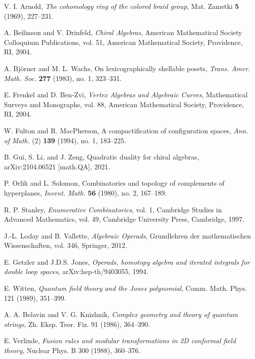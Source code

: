 \begin{thebibliography}{99}

V. I. Arnold, \emph{The cohomology ring of the colored braid group}, 
Mat. Zametki \textbf{5} (1969), 227--231.

 A. Beilinson and V. Drinfeld, \emph{Chiral Algebras}, American Mathematical Society Colloquium Publications, vol. 51, American Mathematical Society, Providence, RI, 2004.
 
 A. Björner and M. L. Wachs, On lexicographically shellable posets, \emph{Trans. Amer. Math. Soc.} \textbf{277} (1983), no. 1, 323--331.
 
 E. Frenkel and D. Ben-Zvi, \emph{Vertex Algebras and Algebraic Curves}, Mathematical Surveys and Monographs, vol. 88, American Mathematical Society, Providence, RI, 2004.
 
 W. Fulton and R. MacPherson, A compactification of configuration spaces, \emph{Ann. of Math.} (2) \textbf{139} (1994), no. 1, 183--225.
 
 B. Gui, S. Li, and J. Zeng, Quadratic duality for chiral algebras, arXiv:2104.06521 [math.QA], 2021.
 
 P. Orlik and L. Solomon, Combinatorics and topology of complements of hyperplanes, \emph{Invent. Math.} \textbf{56} (1980), no. 2, 167--189.
 
 R. P. Stanley, \emph{Enumerative Combinatorics}, vol. 1, Cambridge Studies in Advanced Mathematics, vol. 49, Cambridge University Press, Cambridge, 1997.

 J.-L. Loday and B. Vallette, \emph{Algebraic Operads}, Grundlehren der mathematischen Wissenschaften, vol. 346, Springer, 2012.

 E. Getzler and J.D.S. Jones, \emph{Operads, homotopy algebra and iterated integrals for double loop spaces}, arXiv:hep-th/9403055, 1994.

 E. Witten, \emph{Quantum field theory and the Jones polynomial}, 
  Comm. Math. Phys. 121 (1989), 351--399.

 A. A. Belavin and V. G. Knizhnik, \emph{Complex geometry and theory of quantum strings}, 
  Zh. Eksp. Teor. Fiz. 91 (1986), 364--390.
  
 E. Verlinde, \emph{Fusion rules and modular transformations in 2D conformal field theory}, 
  Nuclear Phys. B 300 (1988), 360--376.


\end{thebibliography}
